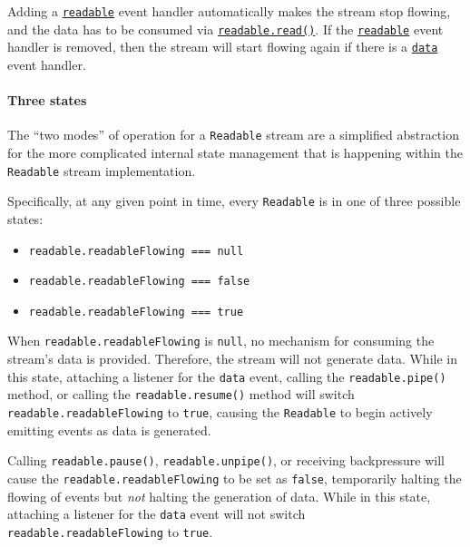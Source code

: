 Adding a
\hyperref[event-readable]{\texttt{\textquotesingle{}readable\textquotesingle{}}}
event handler automatically makes the stream stop flowing, and the data
has to be consumed via
\hyperref[readablereadsize]{\texttt{readable.read()}}. If the
\hyperref[event-readable]{\texttt{\textquotesingle{}readable\textquotesingle{}}}
event handler is removed, then the stream will start flowing again if
there is a
\hyperref[event-data]{\texttt{\textquotesingle{}data\textquotesingle{}}}
event handler.

\paragraph{Three states}\label{three-states}

The ``two modes'' of operation for a \texttt{Readable} stream are a
simplified abstraction for the more complicated internal state
management that is happening within the \texttt{Readable} stream
implementation.

Specifically, at any given point in time, every \texttt{Readable} is in
one of three possible states:

\begin{itemize}
\tightlist
\item
  \texttt{readable.readableFlowing\ ===\ null}
\item
  \texttt{readable.readableFlowing\ ===\ false}
\item
  \texttt{readable.readableFlowing\ ===\ true}
\end{itemize}

When \texttt{readable.readableFlowing} is \texttt{null}, no mechanism
for consuming the stream's data is provided. Therefore, the stream will
not generate data. While in this state, attaching a listener for the
\texttt{\textquotesingle{}data\textquotesingle{}} event, calling the
\texttt{readable.pipe()} method, or calling the
\texttt{readable.resume()} method will switch
\texttt{readable.readableFlowing} to \texttt{true}, causing the
\texttt{Readable} to begin actively emitting events as data is
generated.

Calling \texttt{readable.pause()}, \texttt{readable.unpipe()}, or
receiving backpressure will cause the \texttt{readable.readableFlowing}
to be set as \texttt{false}, temporarily halting the flowing of events
but \emph{not} halting the generation of data. While in this state,
attaching a listener for the
\texttt{\textquotesingle{}data\textquotesingle{}} event will not switch
\texttt{readable.readableFlowing} to \texttt{true}.

